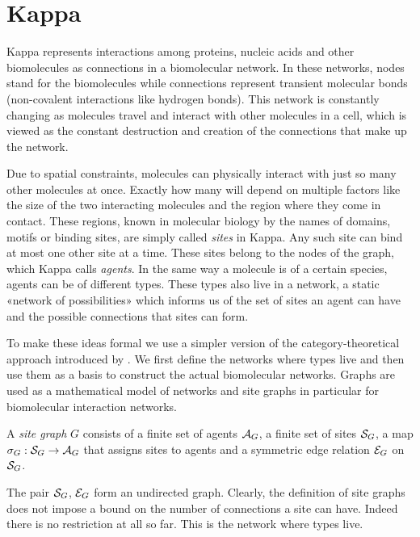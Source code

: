 \section{Kappa}
\label{sec:kappa}

Kappa represents interactions among proteins,
nucleic acids and other biomolecules as
connections in a biomolecular network.
In these networks, nodes stand for the biomolecules
while connections represent transient molecular bonds
(\eg non-covalent interactions like hydrogen bonds).
This network is constantly changing as molecules
travel and interact with other molecules in a cell,
which is viewed as the constant destruction and creation
of the connections that make up the network.

Due to spatial constraints,
molecules can physically interact with
just so many other molecules at once.
Exactly how many will depend on multiple factors
like the size of the two interacting molecules
and the region where they come in contact.
These regions, known in molecular biology by the names of domains,
motifs or binding sites, are simply called \emph{sites} in Kappa.
Any such site can bind at most one other site at a time.
These sites belong to the nodes of the graph,
which Kappa calls \emph{agents}. %
In the same way a molecule is of a certain species,
agents can be of different types.
These types also live in a network,
a static «network of possibilities» which
informs us of the set of sites an agent can have
and the possible connections that sites can form.

To make these ideas formal we use a simpler version of
the category-theoretical approach
introduced by \citet{kappadpo}.
We first define the networks where types live and then
use them as a basis to construct the actual biomolecular networks.
Graphs are used as a mathematical model of networks
and site graphs in particular for biomolecular interaction networks.

\begin{definition}%
  A \emph{site graph} $G$ consists of
  a finite set of agents $\mathcal{A}_G$,
  a finite set of sites $\mathcal{S}_G$,
  a map $\sigma_G: \mathcal{S}_G \to \mathcal{A}_G$
  that assigns sites to agents
  and a symmetric edge relation $\mathcal{E}_G$ on $\mathcal{S}_G$.
\end{definition}

The pair $\mathcal{S}_G$, $\mathcal{E}_G$ form an undirected graph.
Clearly, the definition of site graphs does not impose
a bound on the number of connections a site can have.
Indeed there is no restriction at all so far.
This is the network where types live.

